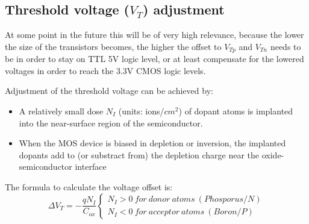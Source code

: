 \subsection{Threshold voltage ($V_T$) adjustment}
At some point in the future this will be of very high relevance, because the lower the size of the transistors becomes, the higher the offset to $V_{Tp}$ and $V_{Tn}$ needs to be in order to stay on TTL 5V logic level, or at least compensate for the lowered voltages in order to reach the 3.3V CMOS logic levels.

Adjustment of the threshold voltage can be achieved by:
\begin{itemize}
\item A relatively small dose $N_I$ (units: ions/$cm^2$) of dopant atoms is implanted into the near-surface  region of the semiconductor.
\item When the MOS device is biased in depletion or inversion, the implanted dopants add to (or substract from) the depletion charge near the oxide-semiconductor interface
\end{itemize}

The formula to calculate the voltage offset is:
\begin{equation}
\Delta V_T = -\frac{q N_I}{C_{ox}} 
\left\{\begin{matrix}
N_I > 0\ for\ donor\ atoms\ (Phosporus/N) \\
N_I < 0\ for\ acceptor\ atoms\ (Boron/P)
\end{matrix}\right.
\end{equation}
